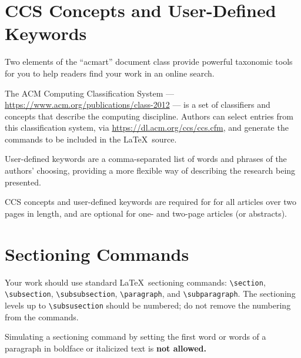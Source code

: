 \section{CCS Concepts and User-Defined Keywords}

Two elements of the ``acmart'' document class provide powerful
taxonomic tools for you to help readers find your work in an online
search.

The ACM Computing Classification System ---
\url{https://www.acm.org/publications/class-2012} --- is a set of
classifiers and concepts that describe the computing
discipline. Authors can select entries from this classification
system, via \url{https://dl.acm.org/ccs/ccs.cfm}, and generate the
commands to be included in the \LaTeX\ source.

User-defined keywords are a comma-separated list of words and phrases
of the authors' choosing, providing a more flexible way of describing
the research being presented.

CCS concepts and user-defined keywords are required for for all
articles over two pages in length, and are optional for one- and
two-page articles (or abstracts).

\section{Sectioning Commands}

Your work should use standard \LaTeX\ sectioning commands:
\verb|\section|, \verb|\subsection|, \verb|\subsubsection|,
\verb|\paragraph|, and \verb|\subparagraph|. The sectioning levels up to
\verb|\subsusection| should be numbered; do not remove the numbering
from the commands.

Simulating a sectioning command by setting the first word or words of
a paragraph in boldface or italicized text is {\bfseries not allowed.}

